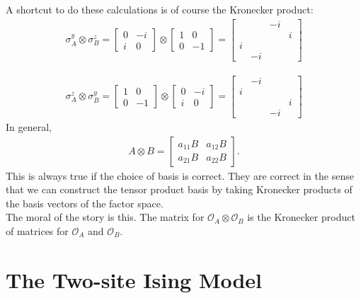\documentclass{book}
\theoremstyle{definition}
\begin{document}
A shortcut to do these calculations is of course the Kronecker product:
\begin{align}
\sigma_A^y \otimes \sigma_B^z = 
\begin{bmatrix}
0 & -i \\ i & 0
\end{bmatrix} \otimes \begin{bmatrix}
1 & 0 \\ 0 & -1
\end{bmatrix}
=\begin{bmatrix}
&&-i&\\
&&&i\\
i&&&\\
&-i&&
\end{bmatrix}
\end{align}

\begin{align}
\sigma^z_A \otimes \sigma^y_B = 
\begin{bmatrix}
1 & 0 \\ 0 & -1
\end{bmatrix} \otimes \begin{bmatrix}
0 & -i \\ i & 0
\end{bmatrix}  
=\begin{bmatrix}
&-i&& \\
i&&&\\
&&&i\\
&&-i&
\end{bmatrix}
\end{align}
In general, 
\begin{align}
A \otimes B = \begin{bmatrix}
a_{11}B & a_{12}B \\ a_{21}B & a_{22}B
\end{bmatrix}.
\end{align}
This is always true if the choice of basis is correct. They are correct in the sense that we can construct the tensor product basis by taking Kronecker products of the basis vectors of the factor space. \\


The moral of the story is this. The matrix for $\mathcal{O}_A \otimes \mathcal{O}_B$ is the Kronecker product of matrices for $\mathcal{O}_A$ and $\mathcal{O}_B$. 






\section{The Two-site Ising Model}
\end{document}
